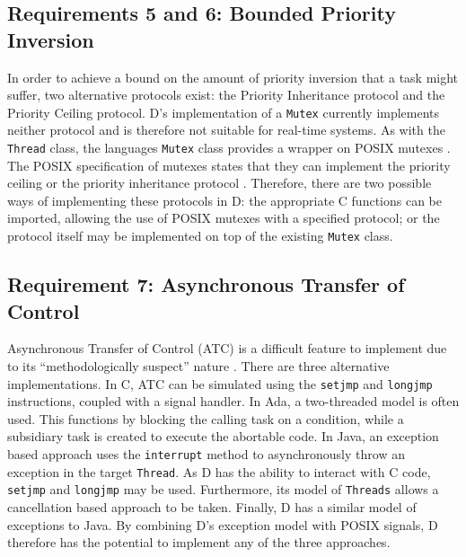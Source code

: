 \subsection{Requirements 5 and 6: Bounded Priority Inversion} %
In order to achieve a bound on the amount of priority inversion that a task
might suffer, two alternative protocols exist: the Priority Inheritance protocol and the
Priority Ceiling protocol. D's implementation of a \texttt{Mutex} currently
implements neither protocol and is therefore not suitable for real-time systems.
As with the \texttt{Thread} class, the languages \texttt{Mutex} class provides 
a wrapper on POSIX mutexes \cite{dlang-github-mutex}. 
The POSIX specification of mutexes states that
they can implement the priority ceiling or the priority inheritance protocol 
\cite{mutex-setprotocol}. Therefore, there are two possible ways of
implementing these protocols in D: 
the appropriate C functions can be imported, allowing the
use of POSIX mutexes with a specified protocol; or the protocol itself may be
implemented on top of the existing \texttt{Mutex} class. 

\subsection{Requirement 7: Asynchronous Transfer of Control} %
Asynchronous Transfer of Control (ATC) is a difficult feature to implement due to
its ``methodologically suspect'' nature \cite{Brosgol:2002:ATC}. There are
three alternative implementations. In C, ATC can be simulated using the
\texttt{setjmp} and \texttt{longjmp} instructions, coupled with a signal
handler. In Ada, a
two-threaded model is often used. This functions by blocking the calling task
on a condition, while a subsidiary task is created to execute the abortable
code. In Java, an exception based approach uses the \texttt{interrupt}
method to asynchronously throw an exception in the target \texttt{Thread}. 
As D has the ability to interact with C code, \texttt{setjmp} and \texttt{longjmp} may be
used. Furthermore, its model of \texttt{Threads} allows a cancellation based
approach to be taken. Finally, D has a similar model of exceptions to Java. By
combining D's exception model with POSIX signals, D therefore has the potential 
to implement any of the three approaches.
